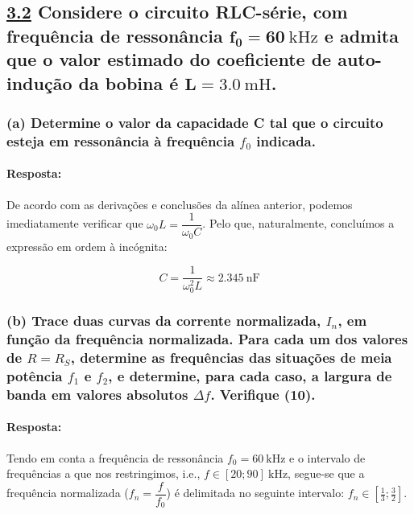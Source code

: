 \clearpage
\subsection*{\underline{3.2} Considere o circuito RLC-série, com frequência de ressonância $\mathbf{f_0 = 60}\ \text{kHz}$ e admita que o valor estimado do coeficiente de auto-indução da bobina é $\mathbf{L = 3.0}\ \text{mH}$.}
\subsubsection*{(a) Determine o valor da capacidade C tal que o circuito esteja em ressonância à frequência $f_0$ indicada.}
\label{subsubsec_a}
\paragraph{Resposta:}
De acordo com as derivações e conclusões da alínea anterior, podemos imediatamente verificar que $\omega_0 L = \dfrac{1}{\omega_0 C}$. Pelo que, naturalmente, concluímos a expressão em ordem à incógnita:

$$
C = \frac{1}{\omega_0^2 L} \approx 2.345\ \text{nF}
$$

\subsubsection*{(b) Trace duas curvas da corrente normalizada, $I_n$, em função da frequência normalizada. Para cada um dos valores de $R=R_S$, determine as frequências das situações de meia potência $f_1$ e $f_2$, e determine, para cada caso, a largura de banda em valores absolutos $\Delta f$. Verifique (10).}
\paragraph{Resposta:}
Tendo em conta a frequência de ressonância $f_0 = 60\ \text{kHz}$ e o intervalo de frequências a que nos restringimos, i.e., $f \in \left[20; 90\right]\ \text{kHz}$, segue-se que a frequência normalizada ($f_n = \dfrac{f}{f_0}$) é delimitada no seguinte
intervalo: $f_n \in \left[\frac{1}{3}; \frac{3}{2}\right]$. 

